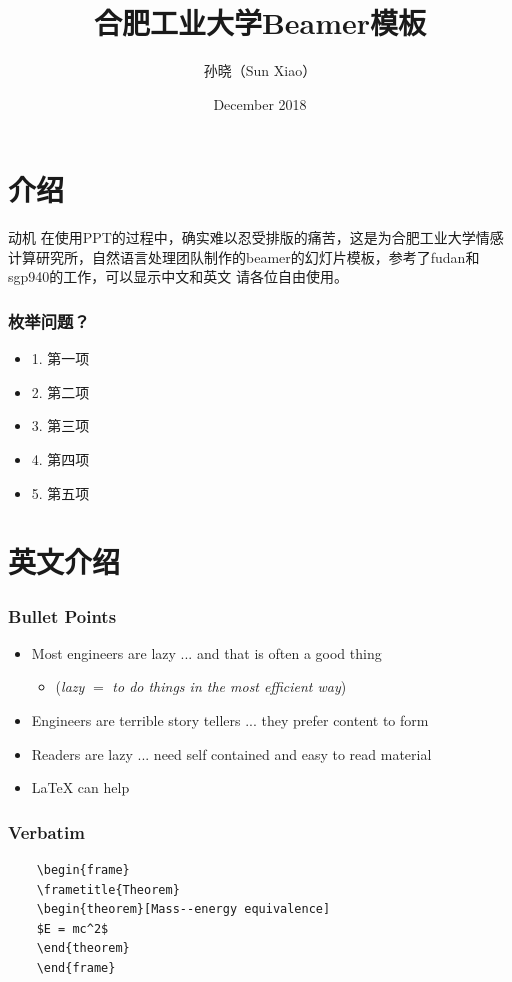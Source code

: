 \documentclass{beamer}
\title{合肥工业大学Beamer模板}
\author{孙晓（Sun Xiao）}
\institute{Institute of Affective Computing, School of Computer and Information}
\date{December 2018}
\begin{document}
  
  \begin{frame}
    \maketitle
  \end{frame}

\section{介绍}

\begin{frame}{动机}
在使用PPT的过程中，确实难以忍受排版的痛苦，这是为合肥工业大学情感计算研究所，自然语言处理团队制作的beamer的幻灯片模板，参考了fudan和sgp940的工作，可以显示中文和英文
请各位自由使用。
\end{frame}


\begin{frame}
\frametitle{枚举问题？}
\begin{itemize}
\item 1. 第一项
\item 2. 第二项
\item 3. 第三项
\item 4. 第四项
\item 5. 第五项
\end{itemize}
\end{frame}


\section{英文介绍}
\begin{frame}
\frametitle{Bullet Points}
\vspace{-0.3cm}
\begin{itemize}
	\item Most engineers are lazy ... and that is often a good thing
	\begin{itemize}
		\item (\textit{lazy} $=$ \textit{to do things in the most efficient way})
	\end{itemize}
	\item Engineers are terrible story tellers ... they prefer content to form
	\item Readers are lazy ... need self contained and easy to read material
	\item \LaTeX{} can help
\end{itemize}
\end{frame}

\begin{frame}[fragile] %
\frametitle{Verbatim}
\begin{example}
	\begin{verbatim}
	\begin{frame}
	\frametitle{Theorem}
	\begin{theorem}[Mass--energy equivalence]
	$E = mc^2$
	\end{theorem}
	\end{frame}\end{verbatim}
\end{example}
\end{frame}
\end{document}
